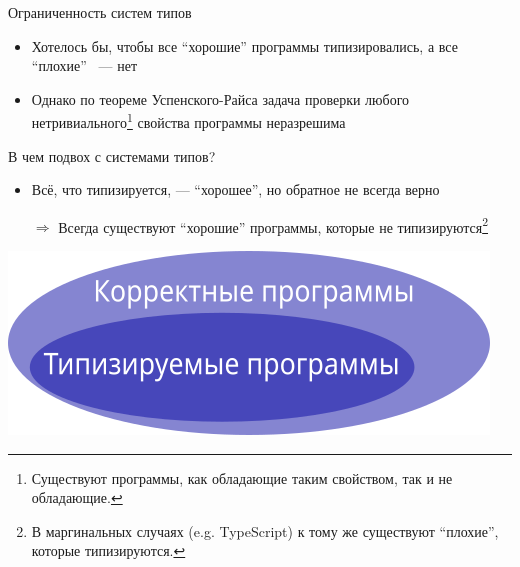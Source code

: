     \begin{frame}{Ограниченность систем типов}
        \begin{itemize}
            \item Хотелось бы, чтобы все ``хорошие'' программы типизировались, а все ``плохие'' ~--- нет
            \item Однако по теореме Успенского-Райса задача проверки любого нетривиального\footnote{Существуют программы, как обладающие таким свойством, так и не обладающие.} свойства программы неразрешима
        \end{itemize}
        \pause
        \vspace{1em}
        В чем подвох с системами типов? \pause
        \begin{itemize}
            \item Всё, что типизируется, --- ``хорошее'', но обратное не всегда верно
            \item[$\Rightarrow$] Всегда существуют ``хорошие'' программы, которые не типизируются\footnote{В маргинальных случаях (e.g. TypeScript) к тому же существуют ``плохие'', которые типизируются.}
        \end{itemize}
        \begin{center}
            \includegraphics[height=0.25\textheight]{figs/types}
        \end{center}
    \end{frame}

